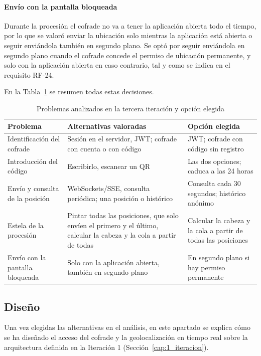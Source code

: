 \paragraph{Envío con la pantalla bloqueada}
Durante la procesión el cofrade no va a tener la aplicación abierta todo el tiempo, por lo que se valoró enviar la ubicación solo mientras la aplicación está abierta o seguir enviándola también en segundo plano. Se optó por seguir enviándola en segundo plano cuando el cofrade concede el permiso de ubicación permanente, y solo con la aplicación abierta en caso contrario, tal y como se indica en el requisito RF-24.

En la Tabla~\ref{tab:alternativasIt3} se resumen todas estas decisiones.

\begin{table}[H]
\centering
\small
\begin{tabular}{|p{3.6cm}|p{5.6cm}|p{4.4cm}|}
\hline
\textbf{Problema} & \textbf{Alternativas valoradas} & \textbf{Opción elegida} \\
\hline
Identificación del cofrade & Sesión en el servidor, JWT; cofrade con cuenta o con código & JWT; cofrade con código sin registro \\
\hline
Introducción del código & Escribirlo, escanear un QR & Las dos opciones; caduca a las 24 horas \\
\hline
Envío y consulta de la posición & WebSockets/SSE, consulta periódica; una posición o histórico & Consulta cada 30 segundos; histórico anónimo \\
\hline
Estela de la procesión & Pintar todas las posiciones, que solo envíen el primero y el último, calcular la cabeza y la cola a partir de todas & Calcular la cabeza y la cola a partir de todas las posiciones \\
\hline
Envío con la pantalla bloqueada & Solo con la aplicación abierta, también en segundo plano & En segundo plano si hay permiso permanente \\
\hline
\end{tabular}
\caption{Problemas analizados en la tercera iteración y opción elegida}
\label{tab:alternativasIt3}
\end{table}

\subsection{Diseño}

Una vez elegidas las alternativas en el análisis, en este apartado se explica cómo se ha diseñado el acceso del cofrade y la geolocalización en tiempo real sobre la arquitectura definida en la Iteración 1 (Sección~\ref{cap:1_iteracion}).

